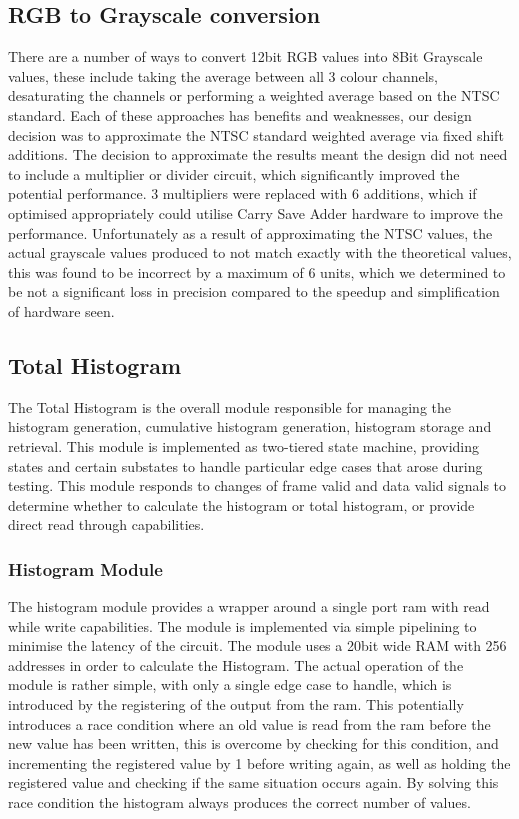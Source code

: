 \documentclass[12pt]{article}
\begin{document}
  \subsection{RGB to Grayscale conversion}
  There are a number of ways to convert 12bit RGB values into 8Bit Grayscale values, these include taking the average between all 3 colour channels, desaturating the channels or performing a weighted average based on the NTSC standard. Each of these approaches has benefits and weaknesses, our design decision was to approximate the NTSC standard weighted average via fixed shift additions. The decision to approximate the results meant the design did not need to include a multiplier or divider circuit, which significantly improved the potential performance. 3 multipliers were replaced with 6 additions, which if optimised appropriately could utilise Carry Save Adder hardware to improve the performance. Unfortunately as a result of approximating the NTSC values, the actual grayscale values produced to not match exactly with the theoretical values, this was found to be incorrect by a maximum of 6 units, which we determined to be not a significant loss in precision compared to the speedup and simplification of hardware seen.

  \subsection{Total Histogram}
  The Total Histogram is the overall module responsible for managing the histogram generation, cumulative histogram generation, histogram storage and retrieval. This module is implemented as two-tiered state machine, providing states and certain substates to handle particular edge cases that arose during testing. This module responds to changes of frame valid and data valid signals to determine whether to calculate the histogram or total histogram, or provide direct read through capabilities.

  \subsubsection{Histogram Module}
  The histogram module provides a wrapper around a single port ram with read while write capabilities. The module is implemented via simple pipelining to minimise the latency of the circuit. The module uses a 20bit wide RAM with 256 addresses in order to calculate the Histogram. The actual operation of the module is rather simple, with only a single edge case to handle, which is introduced by the registering of the output from the ram. This potentially introduces a race condition where an old value is read from the ram before the new value has been written, this is overcome by checking for this condition, and incrementing the registered value by 1 before writing again, as well as holding the registered value and checking if the same situation occurs again. By solving this race condition the histogram always produces the correct number of values.
\end{document}
